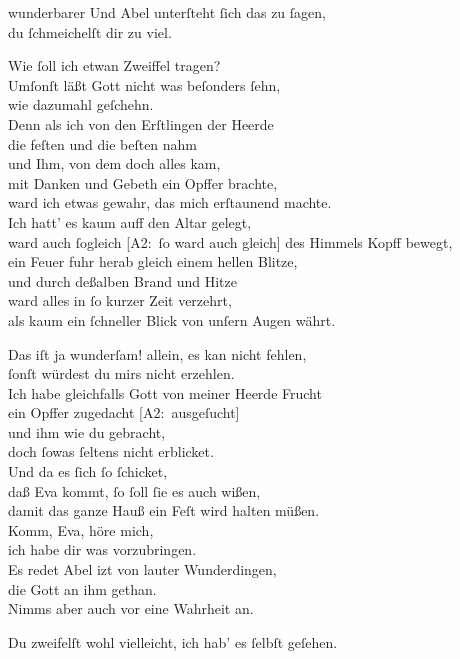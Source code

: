 \documentclass[abbrwidth=6em,tocstyle=ref-genre]{ees}
\newcommand\altlyrics[1]{[\textmd{A2}:~#1]}
\begin{document}
{\begin{movement}{wunderbarer}
  \voice[Cain]
  Und Abel unterſteht ſich das zu ſagen,\\
  du ſchmeichelſt dir zu viel.

  \voice[Abel]
  Wie ſoll ich etwan Zweiffel tragen?\\
  Umſonſt läßt Gott nicht was beſonders ſehn,\\
  wie dazumahl geſchehn.\\
  Denn als ich von den Erſtlingen der Heerde\\
  die feſten und die beſten nahm\\
  und Ihm, von dem doch alles kam,\\
  mit Danken und Gebeth ein Opffer brachte,\\
  ward ich etwas gewahr, das mich erſtaunend machte.\\
  Ich hatt’ es kaum auff den Altar gelegt,\\
  ward auch ſogleich \altlyrics{ſo ward auch gleich} des Himmels Kopff bewegt,\\
  ein Feuer fuhr herab gleich einem hellen Blitze,\\
  und durch deßalben Brand und Hitze\\
  ward alles in ſo kurzer Zeit verzehrt,\\
  als kaum ein ſchneller Blick von unſern Augen währt.

  \voice[Cain]
  Das iſt ja wunderſam! allein, es kan nicht fehlen,\\
  ſonſt würdest du mirs nicht erzehlen.\\
  Ich habe gleichfalls Gott von meiner Heerde Frucht\\
  ein Opffer zugedacht \altlyrics{ausgeſucht}\\
  und ihm wie du gebracht,\\
  doch ſowas ſeltens nicht erblicket.\\
  Und da es ſich ſo ſchicket,\\
  daß Eva kommt, ſo ſoll ſie es auch wißen,\\
  damit das ganze Hauß ein Feſt wird halten müßen.\\
  Komm, Eva, höre mich,\\
  ich habe dir was vorzubringen.\\
  Es redet Abel izt von lauter Wunderdingen,\\
  die Gott an ihm gethan.\\
  Nimms aber auch vor eine Wahrheit an.

  \voice[Eva]
  Du zweifelſt wohl vielleicht, ich hab’ es ſelbſt geſehen.


\end{movement}}
\end{document}
